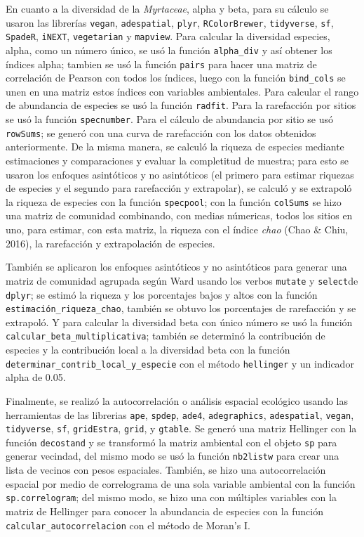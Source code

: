 \documentclass[11pt,]{article}
\begin{document}
En cuanto a la diversidad de la \emph{Myrtaceae}, alpha y beta, para su
cálculo se usaron las librerías \texttt{vegan}, \texttt{adespatial},
\texttt{plyr}, \texttt{RColorBrewer}, \texttt{tidyverse}, \texttt{sf},
\texttt{SpadeR}, \texttt{iNEXT}, \texttt{vegetarian} y \texttt{mapview}.
Para calcular la diversidad especies, alpha, como un número único, se
usó la función \texttt{alpha\_div} y así obtener los índices alpha;
tambien se usó la función \texttt{pairs} para hacer una matriz de
correlación de Pearson con todos los índices, luego con la función
\texttt{bind\_cols} se unen en una matriz estos índices con variables
ambientales. Para calcular el rango de abundancia de especies se usó la
función \texttt{radfit}. Para la rarefacción por sitios se usó la
función \texttt{specnumber}. Para el cálculo de abundancia por sitio se
usó \texttt{rowSums}; se generó con una curva de rarefacción con los
datos obtenidos anteriormente. De la misma manera, se calculó la riqueza
de especies mediante estimaciones y comparaciones y evaluar la
completitud de muestra; para esto se usaron los enfoques asintóticos y
no asintóticos (el primero para estimar riquezas de especies y el
segundo para rarefacción y extrapolar), se calculó y se extrapoló la
riqueza de especies con la función \texttt{specpool}; con la función
\texttt{colSums} se hizo una matriz de comunidad combinando, con medias
númericas, todos los sitios en uno, para estimar, con esta matriz, la
riqueza con el índice \emph{chao} (Chao \& Chiu, 2016), la rarefacción y
extrapolación de especies.

También se aplicaron los enfoques asintóticos y no asintóticos para
generar una matriz de comunidad agrupada según Ward usando los verbos
\texttt{mutate} y \texttt{select}de \texttt{dplyr}; se estimó la riqueza
y los porcentajes bajos y altos con la función
\texttt{estimación\_riqueza\_chao}, también se obtuvo los porcentajes de
rarefacción y se extrapoló. Y para calcular la diversidad beta con único
número se usó la función \texttt{calcular\_beta\_multiplicativa};
también se determinó la contribución de especies y la contribución local
a la diversidad beta con la función
\texttt{determinar\_contrib\_local\_y\_especie} con el método
\texttt{hellinger} y un indicador alpha de 0.05.

Finalmente, se realizó la autocorrelación o análisis espacial ecológico
usando las herramientas de las librerias \texttt{ape}, \texttt{spdep},
\texttt{ade4}, \texttt{adegraphics}, \texttt{adespatial},
\texttt{vegan}, \texttt{tidyverse}, \texttt{sf}, \texttt{gridEstra},
\texttt{grid}, y \texttt{gtable}. Se generó una matriz Hellinger con la
función \texttt{decostand} y se transformó la matriz ambiental con el
objeto \texttt{sp} para generar vecindad, del mismo modo se usó la
función \texttt{nb2listw} para crear una lista de vecinos con pesos
espaciales. También, se hizo una autocorrelación espacial por medio de
correlograma de una sola variable ambiental con la función
\texttt{sp.correlogram}; del mismo modo, se hizo una con múltiples
variables con la matriz de Hellinger para conocer la abundancia de
especies con la función \texttt{calcular\_autocorrelacion} con el método
de Moran's I.
\end{document}
